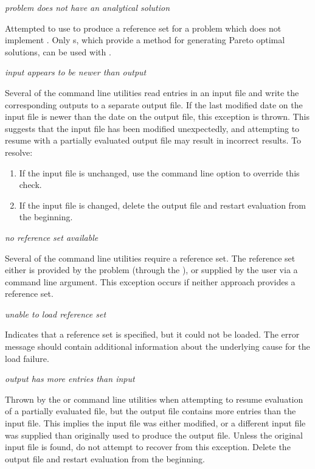 \noindent
\textit{problem does not have an analytical solution}
\begin{indented}
  Attempted to use  to produce a reference set for a problem which does not implement .  Only s, which provide a method for generating Pareto optimal solutions, can be used with .
\end{indented}

\noindent
\textit{input appears to be newer than output}
\begin{indented}
  Several of the command line utilities read entries in an input file and write the corresponding outputs to a separate output file.  If the last modified date on the input file is newer than the date on the output file, this exception is thrown.  This suggests that the input file has been modified unexpectedly, and attempting to resume with a partially evaluated output file may result in incorrect results.  To resolve:
  \begin{enumerate}
    \item If the input file is unchanged, use the  command line option to override this check.
    \item If the input file is changed, delete the output file and restart evaluation from the beginning.
  \end{enumerate}
\end{indented}

\noindent
\textit{no reference set available}
\begin{indented}
  Several of the command line utilities require a reference set.  The reference set either is provided by the problem (through the ), or supplied by the user via a command line argument.  This exception occurs if neither approach provides a reference set.
\end{indented}

\noindent
\textit{unable to load reference set}
\begin{indented}
  Indicates that a reference set is specified, but it could not be loaded. The error message should contain additional information about the underlying cause for the load failure.
\end{indented}

\noindent
\textit{output has more entries than input}
\begin{indented}
  Thrown by the  or  command line utilities when attempting to resume evaluation of a partially evaluated file, but the output file contains more entries than the input file.  This implies the input file was either modified, or a different input file was supplied than originally used to produce the output file.  Unless the original input file is found, do not attempt to recover from this exception.  Delete the output file and restart evaluation from the beginning.
\end{indented}

